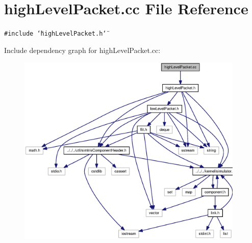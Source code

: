 \section{highLevelPacket.cc File Reference}
\label{highLevelPacket_8cc}
{\tt \#include \char`\"{}highLevelPacket.h\char`\"{}}\par


Include dependency graph for highLevelPacket.cc:\nopagebreak
\begin{figure}[H]
\begin{center}
\leavevmode
\includegraphics[width=306pt]{highLevelPacket_8cc__incl}
\end{center}
\end{figure}
